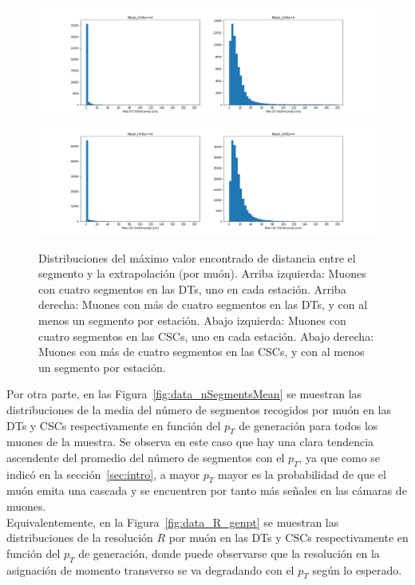 \begin{figure}[h]
\centering
\includegraphics[width=1.1\textwidth]{figures/data_simple_DT_dist.png}
\includegraphics[width=1.1\textwidth]{figures/data_simple_CSC_dist.png}
\caption{Distribuciones del m\'aximo valor encontrado de distancia entre el segmento y la extrapolaci\'on (por mu\'on). Arriba izquierda: Muones con cuatro segmentos en las DTs, uno en cada estaci\'on. Arriba derecha: Muones con m\'as de cuatro segmentos en las DTs, y con al menos un segmento por estaci\'on. Abajo izquierda: Muones con cuatro segmentos en las CSCs, uno en cada estaci\'on. Abajo derecha: Muones con m\'as de cuatro segmentos en las CSCs, y con al menos un segmento por estaci\'on.}
\label{fig:data_dist}        
\end{figure}


Por otra parte, en las Figura~\ref{fig:data_nSegmentsMean} se muestran las distribuciones de la media del n\'umero de segmentos recogidos por mu\'on en las DTs y CSCs respectivamente en funci\'on del $p_{T}$ de generaci\'on para todos los muones de la muestra. Se observa en este caso que hay una clara tendencia ascendente del promedio del n\'umero de segmentos con el $p_{T}$, ya que como se indic\'o en la secci\'on~\ref{sec:intro}, a mayor $p_{T}$ mayor es la probabilidad de que el mu\'on emita una cascada y se encuentren por tanto m\'as se\~nales en las c\'amaras de muones. \\


Equivalentemente, en la Figura~\ref{fig:data_R_genpt} se muestran las distribuciones de la resoluci\'on $R$ por mu\'on en las DTs y CSCs respectivamente en funci\'on del $p_{T}$ de generaci\'on, donde puede observarse que la resoluci\'on en la asignaci\'on de momento transverso se va degradando con el $p_{T}$ seg\'un lo esperado. \\

